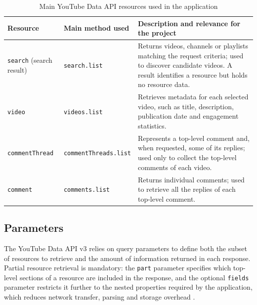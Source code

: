 \begin{table}[htbp]
    \centering
    \small
    \caption{Main YouTube Data API resources used in the application}
    \label{tab:youtube_api_core_resources}
    \begin{tabularx}
        {\textwidth}{>{\raggedright\arraybackslash}p{2.8cm}>{\raggedright\arraybackslash}p{3.2cm}X}
        \toprule
        \textbf{Resource}               & \textbf{Main method used}                & \textbf{Description and relevance for the project}                                                                                                                 \\
        \midrule
        \texttt{search} (search result) & \texttt{search.\allowbreak list}         & Returns videos, channels or playlists matching the request criteria; used to discover candidate videos. A result identifies a resource but holds no resource data. \\
        \midrule
        \texttt{video}                  & \texttt{videos.\allowbreak list}         & Retrieves metadata for each selected video, such as title, description, publication date and engagement statistics.                                                \\
        \midrule
        \texttt{commentThread}          & \texttt{commentThreads.\allowbreak list} & Represents a top-level comment and, when requested, some of its replies; used only to collect the top-level comments of each video.                                \\
        \midrule
        \texttt{comment}                & \texttt{comments.\allowbreak list}       & Returns individual comments; used to retrieve all the replies of each top-level comment.                                                                           \\
        \bottomrule
    \end{tabularx}
\end{table}

\subsection{Parameters}

The YouTube Data API v3 relies on query parameters to define both the subset of resources to retrieve and the amount of information returned in each response. Partial resource retrieval is mandatory: the \texttt{part} parameter specifies which top-level sections of a resource are included in the response, and the optional \texttt{fields} parameter restricts it further to the nested properties required by the application, which reduces network transfer, parsing and storage overhead \autocite{youtube_data_api_docs}.

